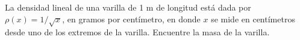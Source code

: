\item La densidad lineal de una varilla de 1 m de longitud está dada por $\rho(x) = 1/\sqrt{x}$, en gramos por centímetro, en donde $x$ se mide en centímetros desde uno de los extremos de la varilla. Encuentre la masa de la varilla.
